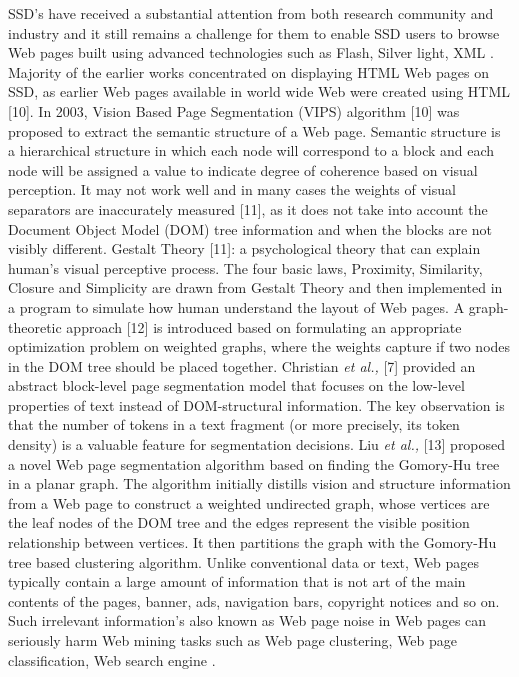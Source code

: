 \documentclass[fleqn,twoside]{article}
\begin{document}
SSD's have received a substantial attention from both research community and industry and it still remains a challenge for them to enable SSD users to browse Web pages built using advanced technologies such as Flash, Silver light, XML .  Majority of the earlier works concentrated on displaying HTML Web pages on SSD, as earlier Web pages available in world wide Web were created using HTML [10].   
\vskip 2mm
In 2003, Vision Based Page Segmentation (VIPS) algorithm [10] was proposed to extract the semantic structure of a Web page. Semantic structure is a hierarchical structure in which each node will correspond to a block and each node will be assigned a value to indicate degree of coherence based on visual perception. It may not work well and in many cases the weights of visual separators are inaccurately measured [11],   as it does not take into account the Document Object Model (DOM) tree information and when the blocks are not visibly different. Gestalt Theory [11]: a psychological theory that can explain human's visual perceptive process. The four basic laws, Proximity, Similarity, Closure and Simplicity are drawn from Gestalt Theory and then implemented in a program to simulate how human understand the layout of Web pages. 
\vskip 2mm
A graph-theoretic approach [12] is introduced based on formulating an appropriate optimization problem on weighted graphs, where the weights capture if two nodes in the DOM tree should be placed together. Christian {\it et al.,} [7] provided an abstract block-level page segmentation model that focuses on the low-level properties of text instead of DOM-structural information. The key observation is that the number of tokens in a text fragment (or more precisely, its token density) is a valuable feature for segmentation decisions. Liu {\it et al.,} [13] proposed a novel Web page segmentation algorithm based on finding the Gomory-Hu tree in a planar graph. The algorithm initially distills vision and structure information from a Web page to construct a weighted undirected graph, whose vertices are the leaf nodes of the DOM tree and the edges represent the visible position relationship between vertices.  It then partitions the graph with the Gomory-Hu tree based clustering algorithm. 
\vskip 2mm
Unlike conventional data or text, Web pages typically contain a large amount of information that is not art of the main contents of the pages,  banner, ads, navigation bars, copyright notices and so on. Such irrelevant information's also known as Web page noise in Web pages can seriously harm Web mining tasks such as Web page clustering, Web page classification, Web search engine .
\end{document}
